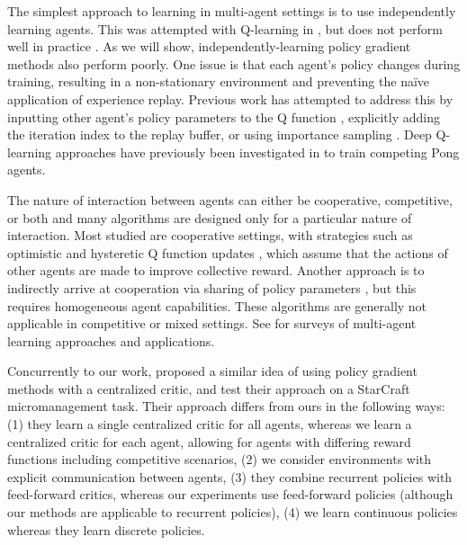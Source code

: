 \documentclass{article}
\begin{document}
The simplest approach to learning in multi-agent settings is to use independently learning agents. This was attempted with Q-learning in \cite{tan93multi}, but does not perform well in practice \cite{matignon12independent}. As we will show, independently-learning policy gradient methods also perform poorly. 
One issue is that each agent's policy changes during training, resulting in a non-stationary environment and preventing the na{\"i}ve application of experience replay. 
Previous work has attempted to address this by inputting other agent’s policy parameters to the Q function \cite{hyper_q}, explicitly adding the iteration index to the replay buffer, or using importance sampling \cite{foerster_nonstat}. Deep Q-learning approaches have previously been investigated in \cite{tampuu2017multiagent} to train competing Pong agents.


The nature of interaction between agents can either be cooperative, competitive, or both and many algorithms are designed only for a particular nature of interaction. Most studied are cooperative settings, with strategies such as optimistic and hysteretic Q function updates \cite{lauer00distributed,hyst07,hyst17}, which assume that the actions of other agents are made to improve collective reward. Another approach is to indirectly arrive at cooperation via sharing of policy parameters \cite{gupta17cooperative}, but this requires homogeneous agent capabilities. These algorithms are generally not applicable in competitive or mixed settings. See \cite{panait05,busoniu2008comprehensive} for surveys of multi-agent learning approaches and applications.

Concurrently to our work, \cite{foerster2017counterfactual} proposed a similar idea of using policy gradient methods with a centralized critic, and test their approach on a StarCraft micromanagement task. Their approach differs from ours in the following ways: (1) they learn a single centralized critic for all agents, whereas we learn a centralized critic for each agent, allowing for agents with differing reward functions including competitive scenarios, (2) we consider environments with explicit communication between agents, (3) they combine recurrent policies with feed-forward critics, whereas our experiments use feed-forward policies (although our methods are applicable to recurrent policies), (4) we learn continuous policies whereas they learn discrete policies.  
\end{document}
